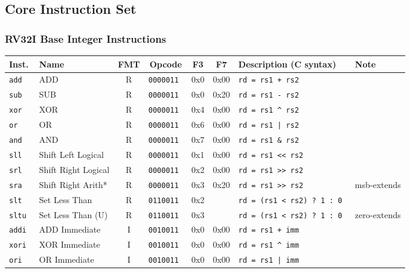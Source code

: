 \subsection*{Core Instruction Set}

\subsubsection*{RV32I Base Integer Instructions}

\begin{tabular}
{l | l | c | c | c | c | l | l} \hline
Inst.     & Name                    & FMT& Opcode       & F3  & F7    & Description (C syntax)        & Note     \\ \hline
\tt{add}  & ADD                     & R  & \tt{0000011} & 0x0 & 0x00  & \tt{rd = rs1 + rs2}           & \\
\tt{sub}  & SUB                     & R  & \tt{0000011} & 0x0 & 0x20  & \tt{rd = rs1 - rs2}           & \\
\tt{xor}  & XOR                     & R  & \tt{0000011} & 0x4 & 0x00  & \tt{rd = rs1 \^{} rs2}        & \\
\tt{or}   & OR                      & R  & \tt{0000011} & 0x6 & 0x00  & \tt{rd = rs1 | rs2}           & \\
\tt{and}  & AND                     & R  & \tt{0000011} & 0x7 & 0x00  & \tt{rd = rs1 \& rs2}          & \\
\tt{sll}  & Shift Left Logical      & R  & \tt{0000011} & 0x1 & 0x00  & \tt{rd = rs1 << rs2}          & \\
\tt{srl}  & Shift Right Logical     & R  & \tt{0000011} & 0x2 & 0x00  & \tt{rd = rs1 >> rs2}          & \\
\tt{sra}  & Shift Right Arith*      & R  & \tt{0000011} & 0x3 & 0x20  & \tt{rd = rs1 >> rs2}          & msb-extends \\
\tt{slt}  & Set Less Than           & R  & \tt{0110011} & 0x2 &       & \tt{rd = (rs1 < rs2) ? 1 : 0} & \\
\tt{sltu} & Set Less Than (U)       & R  & \tt{0110011} & 0x3 &       & \tt{rd = (rs1 < rs2) ? 1 : 0} & zero-extends \\ \hline
\tt{addi} & ADD Immediate           & I  & \tt{0010011} & 0x0 & 0x00  & \tt{rd = rs1 + imm}           & \\
\tt{xori} & XOR Immediate           & I  & \tt{0010011} & 0x0 & 0x00  & \tt{rd = rs1 \^{} imm}        & \\
\tt{ori}  & OR Immediate            & I  & \tt{0010011} & 0x0 & 0x00  & \tt{rd = rs1 | imm}           & \\

\end{tabular}
